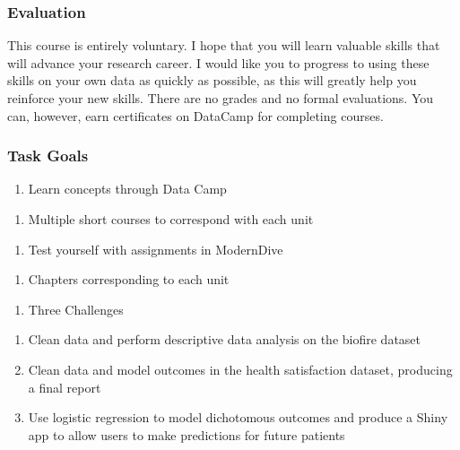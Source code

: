 \documentclass[]{book}
\providecommand{\tightlist}{%
  \setlength{\itemsep}{0pt}\setlength{\parskip}{0pt}}
\theoremstyle{definition}
\theoremstyle{definition}
\theoremstyle{definition}
\theoremstyle{remark}
\begin{document}
\hypertarget{evaluation}{%
\subsubsection{Evaluation}\label{evaluation}}

This course is entirely voluntary. I hope that you will learn valuable
skills that will advance your research career. I would like you to
progress to using these skills on your own data as quickly as possible,
as this will greatly help you reinforce your new skills. There are no
grades and no formal evaluations. You can, however, earn certificates on
DataCamp for completing courses.

\hypertarget{task-goals}{%
\subsubsection{Task Goals}\label{task-goals}}

\begin{enumerate}
\def\labelenumi{\arabic{enumi}.}
\tightlist
\item
  Learn concepts through Data Camp\\
\end{enumerate}

\begin{enumerate}
\def\labelenumi{\alph{enumi}.}
\tightlist
\item
  Multiple short courses to correspond with each unit
\end{enumerate}

\begin{enumerate}
\def\labelenumi{\arabic{enumi}.}
\setcounter{enumi}{1}
\tightlist
\item
  Test yourself with assignments in ModernDive
\end{enumerate}

\begin{enumerate}
\def\labelenumi{\alph{enumi}.}
\tightlist
\item
  Chapters corresponding to each unit
\end{enumerate}

\begin{enumerate}
\def\labelenumi{\arabic{enumi}.}
\setcounter{enumi}{2}
\tightlist
\item
  Three Challenges
\end{enumerate}

\begin{enumerate}
\def\labelenumi{\alph{enumi}.}
\tightlist
\item
  Clean data and perform descriptive data analysis on the biofire
  dataset
\item
  Clean data and model outcomes in the health satisfaction dataset,
  producing a final report
\item
  Use logistic regression to model dichotomous outcomes and produce a
  Shiny app to allow users to make predictions for future patients
\end{enumerate}
\end{document}
